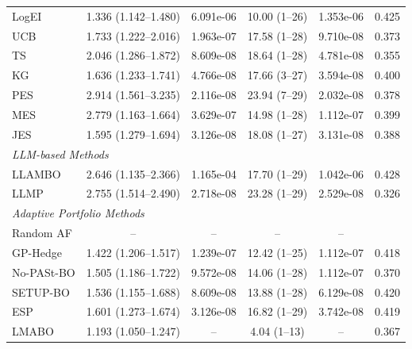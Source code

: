 \begin{table}
\begin{tabular}{@{}lccccc@{}}
LogEI & 1.336 (1.142--1.480) & 6.091e-06 & 10.00 (1--26) & 1.353e-06 & 0.425 \\
UCB & 1.733 (1.222--2.016) & 1.963e-07 & 17.58 (1--28) & 9.710e-08 & 0.373 \\
TS & 2.046 (1.286--1.872) & 8.609e-08 & 18.64 (1--28) & 4.781e-08 & 0.355 \\
KG & 1.636 (1.233--1.741) & 4.766e-08 & 17.66 (3--27) & 3.594e-08 & 0.400 \\
PES & 2.914 (1.561--3.235) & 2.116e-08 & 23.94 (7--29) & 2.032e-08 & 0.378 \\
MES & 2.779 (1.163--1.664) & 3.629e-07 & 14.98 (1--28) & 1.112e-07 & 0.399 \\
JES & 1.595 (1.279--1.694) & 3.126e-08 & 18.08 (1--27) & 3.131e-08 & 0.388 \\
\multicolumn{5}{l}{\textit{LLM-based Methods}} \\
LLAMBO & 2.646 (1.135--2.366) & 1.165e-04 & 17.70 (1--29) & 1.042e-06 & 0.428 \\
LLMP & 2.755 (1.514--2.490) & 2.718e-08 & 23.28 (1--29) & 2.529e-08 & 0.326 \\
\multicolumn{5}{l}{\textit{Adaptive Portfolio Methods}} \\
Random AF & -- & -- & -- & -- \\
GP-Hedge & 1.422 (1.206--1.517) & 1.239e-07 & 12.42 (1--25) & 1.112e-07 & 0.418 \\
No-PASt-BO & 1.505 (1.186--1.722) & 9.572e-08 & 14.06 (1--28) & 1.112e-07 & 0.370 \\
SETUP-BO & 1.536 (1.155--1.688) & 8.609e-08 & 13.88 (1--28) & 6.129e-08 & 0.420 \\
ESP & 1.601 (1.273--1.674) & 3.126e-08 & 16.82 (1--29) & 3.742e-08 & 0.419 \\
\midrule
LMABO & 1.193 (1.050--1.247) & -- & 4.04 (1--13) & -- & 0.367 \\
\bottomrule
    \end{tabular}
    \end{table}
    